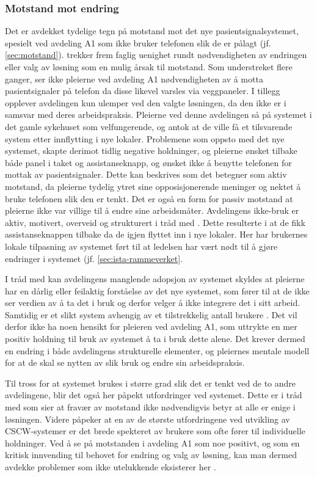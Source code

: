 \subsubsection{Motstand mot endring}
Det er avdekket tydelige tegn på motstand mot det nye pasientsignalsystemet, spesielt ved avdeling A1 som ikke bruker telefonen slik de er pålagt (jf. \ref{sec:motstand}). \citet{Jacobsen12} trekker frem faglig uenighet rundt nødvendigheten av endringen eller valg av løsning som en mulig årsak til motstand. Som understreket flere ganger, ser ikke pleierne ved avdeling A1 nødvendigheten av å motta pasientsignaler på telefon da disse likevel varsles via veggpaneler. I tillegg opplever avdelingen kun ulemper ved den valgte løsningen, da den ikke er i samsvar med deres arbeidspraksis. Pleierne ved denne avdelingen så på systemet i det gamle sykehuset som velfungerende, og antok at de ville få et tilsvarende system etter innflytting i nye lokaler. Problemene som oppsto med det nye systemet, skapte derimot tidlig negative holdninger, og pleierne ønsket tilbake både panel i taket og assistanseknapp, og ønsket ikke å benytte telefonen for mottak av pasientsignaler. Dette kan beskrives som det \citet{Lapointe05} betegner som aktiv motstand, da pleierne tydelig ytret sine opposisjonerende meninger og nektet å bruke telefonen slik den er tenkt. Det er også en form for passiv motstand at pleierne ikke var villige til å endre sine arbeidsmåter. Avdelingens ikke-bruk er aktiv, motivert, overveid og strukturert i tråd med \citet{Satchell09}. Dette resulterte i at de fikk assistanseknappen tilbake da de igjen flyttet inn i nye lokaler. Her har brukernes lokale tilpasning av systemet ført til at ledelsen har vært nødt til å gjøre endringer i systemet (jf. \ref{sec:ista-rammeverket}. 

\noindent
I tråd med \citet{Orlikowski92} kan avdelingens manglende adopsjon av systemet skyldes at pleierne har en dårlig eller feilaktig forståelse av det nye systemet, som fører til at de ikke ser verdien av å ta det i bruk og derfor velger å ikke integrere det i sitt arbeid. Samtidig er et slikt system avhengig av et tilstrekkelig antall brukere \citep{Ackermann00}. Det vil derfor ikke ha noen hensikt for pleieren ved avdeling A1, som uttrykte en mer positiv holdning til bruk av systemet å ta i bruk dette alene. Det krever dermed en endring i både avdelingens strukturelle elementer, og pleiernes mentale modell for at de skal se nytten av slik bruk og endre sin arbeidspraksis.

\noindent
Til tross for at systemet brukes i større grad slik det er tenkt ved de to andre avdelingene, blir det også her påpekt utfordringer ved systemet. Dette er i tråd med \citet{Jacobsen12} som sier at fravær av motstand ikke nødvendigvis betyr at alle er enige i løsningen. Videre påpeker \citet{Berg99} at en av de største utfordringene ved utvikling av CSCW-systemer er det brede spekteret av brukere som ofte fører til individuelle holdninger. Ved å se på motstanden i avdeling A1 som noe positivt, og som en kritisk innvending til behovet for endring og valg av løsning, kan man dermed avdekke problemer som ikke utelukkende eksisterer her \citep{Jacobsen}. 

